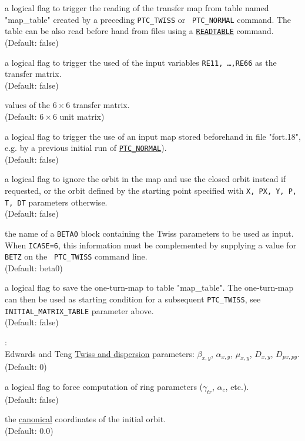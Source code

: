 \begin{madlist}
  a logical flag to trigger the reading of the transfer map from table
  named "map\_table" created by a preceding {\tt PTC\_TWISS} or {\tt
    PTC\_NORMAL} command. The table can be also read 
  before hand from files using a \hyperref[sec:readtable]{\tt READTABLE}
  command.\\ 
  (Default: false)
  
  a logical flag to trigger the used of the input variables {\tt RE11,
    \ldots ,RE66} as the transfer matrix. \\
  (Default: false)

  values of the $6\times 6$ transfer matrix. \\ 
  (Default: $6\times 6$ unit matrix) 
  
  a logical flag to trigger the use of an input map stored beforehand in
  file "fort.18",  e.g. by a previous initial run of
  \hyperref[chap:ptc-normal]{\tt PTC\_NORMAL}). \\
  (Default: false)

  a logical flag to ignore the orbit in the map and use the closed orbit
  instead if requested, or the orbit defined by the starting point
  specified with {\tt X, PX, Y, P, T, DT} parameters otherwise. \\
  (Default: false)

  the name of a {\tt BETA0} block containing the Twiss
  parameters to be used as input. When {\tt ICASE=6}, this information
  must be complemented by supplying a value for {\tt BETZ} on the {\tt
    PTC\_TWISS} command line. \\
  (Default: beta0)

  a logical flag to save the one-turn-map to table
  "map\_table". The one-turn-map can then be used as starting condition
  for a subsequent {\tt PTC\_TWISS}, see {\tt INITIAL\_MATRIX\_TABLE}
  parameter above. \\ (Default: false)

   : \\
  Edwards and Teng \cite{edwards1973} 
  \hyperref[chap:twiss]{Twiss and dispersion} parameters:  
  $\beta_{x,y}$, $\alpha_{x,y}$, $\mu_{x,y}$, $D_{x,y}$, $D_{px,py}$.\\
  (Default: 0) 

   a logical flag to force computation of ring
  parameters ($\gamma_{tr}$, $\alpha_c$, etc.). \\ 
  (Default: false)

   the
  \hyperref[subsec:tables-canon]{canonical} coordinates of the initial
  orbit. \\ (Default: 0.0) \\
  
\end{madlist}


